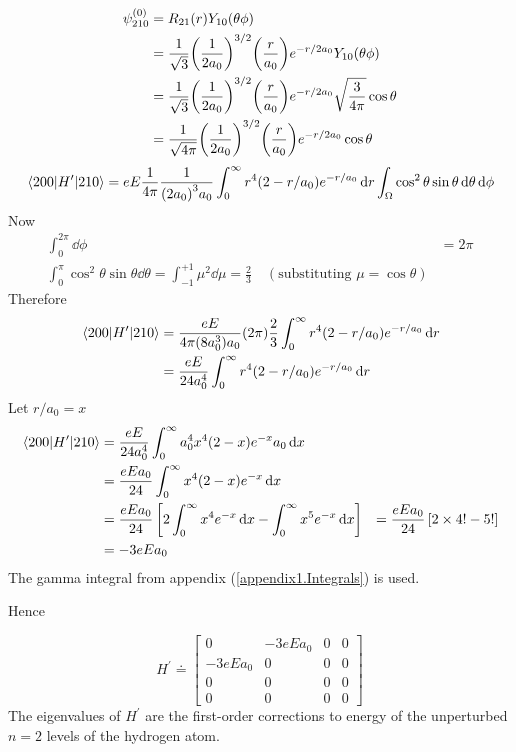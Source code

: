 	\begin{align*}
		\psi_{2 1 0}^{(0)} 
		&= R_{2 1}\qty(r) Y_{1 0}\qty(\theta \phi) \\
		&= \frac{1}{\sqrt{3}} \qty(\frac{1}{2 a_0})^{3/2} \qty(\frac{r}{a_0}) e^{-r/2 a_0} Y_{1 0}\qty(\theta \phi)\\
		&= \frac{1}{\sqrt{3}} \qty(\frac{1}{2 a_0})^{3/2} \qty(\frac{r}{a_0}) e^{-r/2 a_0} \sqrt{\frac{3}{4 \pi}} \cos \theta\\
		&= \frac{1}{\sqrt{4\pi}} \qty(\frac{1}{2 a_0})^{3/2} \qty(\frac{r}{a_0}) e^{-r / 2 a_0} \cos\theta
	\end{align*}
	\begin{align*}
		\mel{2 0 0}{H^\prime}{2 1 0} = e E \frac{1}{4 \pi} \frac{1}{\qty(2 a_0)^3 a_0} \int_{0}^{\infty} r^4 \qty(2 - r/a_0) e^{-r/a_0} \dd{r} \int_{\Omega} \cos^2\theta \sin\theta \dd{\theta} \dd{\phi}
	\end{align*}
	Now
	\begin{align*}
		\int_{0}^{2 \pi} \dd{\phi} &= 2 \pi \\
		\int_{0}^{\pi} \cos^2 \theta \sin \theta\dd{\theta} = \int_{-1}^{+1} \mu^2 \dd{\mu} = \frac{2}{3} \quad (\text{substituting } \mu=\cos\theta )
	\end{align*}
	Therefore
	\begin{align*}
		\mel{2 0 0}{H^\prime}{2 1 0} 
		&=  \frac{e E}{4 \pi \qty(8 a_0^3) a_0} \qty(2\pi) \frac{2}{3} \int_{0}^{\infty} r^4 \qty(2 - r/a_0) e^{-r/a_0} \dd{r} \\
		&= \frac{e E}{24 a_0^4} \int_{0}^{\infty} r^4 \qty(2 - r/a_0) e^{-r / a_0} \dd{r}
	\end{align*}
	Let $r/a_0 = x$
	\begin{align*}
		\mel{2 0 0}{H^\prime}{2 1 0} 
		&= \frac{e E}{24 a_0^4} \int_{0}^{\infty} a_0^4 x^4 \qty(2 - x) e^{-x} a_0\dd{x} \\
		&= \frac{e E a_0}{24} \int_{0}^{\infty}  x^4 \qty(2 - x) e^{-x} \dd{x} \\
		&= \frac{e E a_0}{24} \left[
		2 \int_{0}^{\infty} x^4 e^{-x} \dd{x}
		- \int_{0}^{\infty} x^5 e^{-x} \dd{x}
		\right]
		&= \frac{e E a_0}{24} \left[ 2 \times 4! - 5!\right] \\
		&= -3 e E a_0
	\end{align*}
	The gamma integral from appendix (\ref{appendix1.Integrals}) is used.
	
	Hence
	
	\begin{equation}
		H^\prime \doteq 
		\left[
		\begin{matrix}
		0 & -3 e E a_0 & 0 & 0 \\
		-3 e E a_0 & 0 & 0 & 0 \\
		0 & 0 & 0 & 0 \\
		0 & 0 & 0 & 0 
		\end{matrix}
		\right]
	\end{equation}
	The eigenvalues of $H^\prime$ are the first-order corrections to energy of the unperturbed $n=2$ levels of the hydrogen atom.




